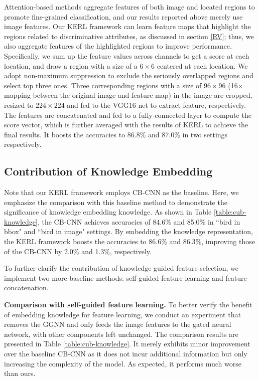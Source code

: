 \documentclass{article}
\begin{document}
Attention-based methods aggregate features of both image and located regions to promote fine-grained classification, and our results reported above merely use image features. Our KERL framework can learn feature maps that highlight the regions related to discriminative attributes, as discussed in section \ref{RV}; thus, we also aggregate features of the highlighted regions to improve performance. Specifically, we sum up the feature values across channels to get a score at each location, and draw a region with a size of a $6 \times 6$ centered at each location. We adopt non-maximum suppression to exclude the seriously overlapped regions and select top three ones. Three corresponding regions with a size of $96 \times 96$ (16$\times$ mapping between the original image and feature map) in the image are cropped, resized to $224 \times 224$ and fed to the VGG16 net to extract feature, respectively. The features are concatenated and fed to a fully-connected layer to compute the score vector, which is further averaged with the results of KERL to achieve the final results. It boosts the accuracies to 86.8\% and 87.0\% in two settings respectively.

\subsection{Contribution of Knowledge Embedding}
Note that our KERL framework employs CB-CNN \cite{gao2016compact} as the baseline. Here, we emphasize the comparison with this baseline method to demonstrate the significance of knowledge embedding knowledge. As shown in Table \ref{table:cub-knowledge}, the CB-CNN achieves accuracies of 84.6\% and 85.0\% in ``bird in bbox" and ``bird in image" settings. By embedding the knowledge representation, the KERL framework boosts the accuracies to 86.6\% and 86.3\%, improving those of the CB-CNN by 2.0\% and 1.3\%, respectively. 

To further clarify the contribution of knowledge guided feature selection, we implement two more baseline methods: self-guided feature learning and feature concatenation.

\noindent\textbf{Comparison with self-guided feature learning. }To better verify the benefit of embedding knowledge for feature learning, we conduct an experiment that removes the GGNN and only feeds the image features to the gated neural network, with other components left unchanged. The comparison results are presented in Table \ref{table:cub-knowledge}. It merely exhibits minor improvement over the baseline CB-CNN as it does not incur additional information but only increasing the complexity of the model. As expected, it performs much worse than ours.
\end{document}
